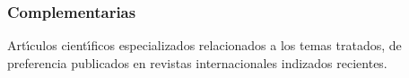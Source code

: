 \subsubsection{Complementarias}

Art\'{\i}culos cient\'{\i}ficos especializados relacionados a los
temas tratados, de preferencia publicados en revistas internacionales
indizados recientes.
